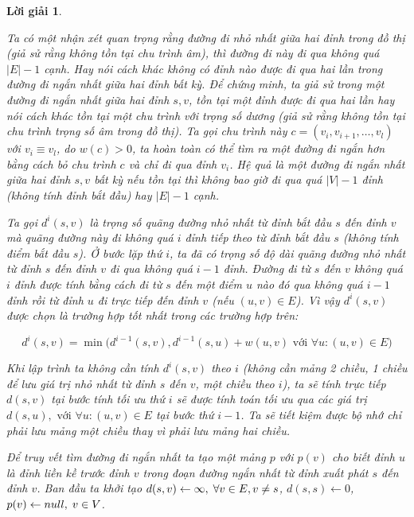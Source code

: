 \documentclass[14pt, a4paper]{article}
\theoremstyle{sltheorem}
\theoremstyle{soltheorem}
\newtheorem*{loigiai}{Lời giải}
\begin{document}
\begin{loigiai}
\begin{itemize}
\begin{itemize}
                
                Ta có một nhận xét quan trọng rằng đường đi nhỏ nhất giữa hai đỉnh trong đồ thị (giả sử rằng không tồn tại chu trình âm), thì đường đi này đi qua không quá $\lvert E \rvert - 1$ cạnh.
                Hay nói cách khác không có đỉnh nào được đi qua hai lần trong đường đi ngắn nhất giữa hai đỉnh bất kỳ.
                Để chứng minh, ta giả sử trong một đường đi ngắn nhất giữa hai đỉnh $s, v$, tồn tại một đỉnh được đi qua hai lần hay nói cách khác tồn tại một chu trình với trọng số dương (giả sử rằng không tồn tại chu trình trọng số âm trong đồ thị).
                Ta gọi chu trình này $c = (v_i, v_{i+1}, \dots, v_l)$ với $v_i \equiv v_l$, do $w(c) > 0$, ta hoàn toàn có thể tìm ra một đường đi ngắn hơn bằng cách bỏ chu trình $c$ và chỉ đi qua đỉnh $v_i$.
                Hệ quả là một đường đi ngắn nhất giữa hai đỉnh $s, v$ bất kỳ nếu tồn tại thì không bao giờ đi qua quá $\lvert V \rvert - 1$ đỉnh (không tính đỉnh bắt đầu) hay $\lvert E \rvert - 1$ cạnh.

                Ta gọi $d^{i}(s, v)$ là trọng số quãng đường nhỏ nhất từ đỉnh bắt đầu $s$ đến đỉnh $v$ mà quãng đường này đi không quá $i$ đỉnh tiếp theo từ đỉnh bắt đầu $s$ (không tính điểm bắt đầu $s$).
                Ở bước lặp thứ $i$, ta đã có trọng số độ dài quãng đường nhỏ nhất từ đỉnh $s$ đến đỉnh $v$ đi qua không quá $i - 1$ đỉnh.
                Đường đi từ $s$ đến $v$ không quá $i$ đỉnh được tính bằng cách đi từ $s$ đến một điểm $u$ nào đó qua không quá $i - 1$ đỉnh rồi từ đỉnh $u$ đi trực tiếp đến đỉnh $v$ (nếu $(u, v) \in E$).
                Vì vậy $d^{i}(s, v)$ được chọn là trường hợp tốt nhất trong các trường hợp trên:

                \begin{equation*}
                    d^{i}(s, v) = \min \big( d^{i - 1}(s, v), d^{i - 1}(s, u) + w(u, v) \text{ với } \forall u: (u, v) \in E \big)
                \end{equation*}

                Khi lập trình ta không cần tính $d^{i}(s, v)$ theo $i$ (không cần mảng 2 chiều, 1 chiều để lưu giá trị nhỏ nhất từ đỉnh $s$ đến $v$, một chiều theo $i$),
                ta sẽ tính trực tiếp $d(s, v)$ tại bước tính tối ưu thứ $i$ sẽ được tính toán tối ưu qua các giá trị $d(s, u), \text{ với } \forall u: (u, v) \in E$ tại bước thứ $i - 1$.
                Ta sẽ tiết kiệm được bộ nhớ chỉ phải lưu mảng một chiều thay vì phải lưu mảng hai chiều.

                Để truy vết tìm đường đi ngắn nhất ta tạo một mảng $p$ với $p(v)$ cho biết đỉnh $u$ là đỉnh liền kề trước đỉnh $v$ trong đoạn đường ngắn nhất từ đỉnh xuất phát $s$ đến đỉnh $v$.
                Ban đầu ta khởi tạo $d(s, v) \gets \infty, \thickspace \forall v \in E, v \neq s$, $d(s, s) \gets 0$, $p(v) \gets null, \thickspace v \in V$.
                

\end{itemize}
\end{itemize}
\end{loigiai}
\end{document}
